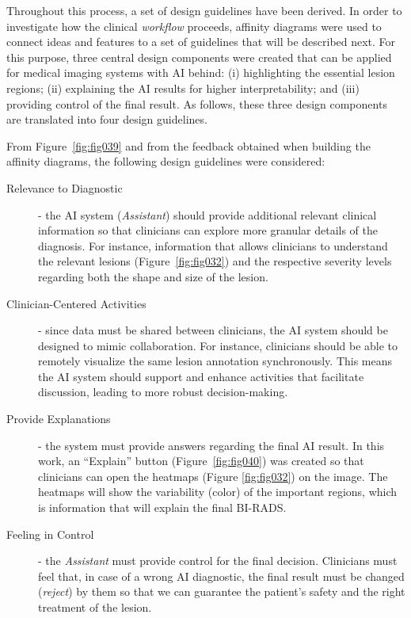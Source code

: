 Throughout this process, a set of design guidelines have been derived.
In order to investigate how the clinical {\it workflow} proceeds, affinity diagrams were used to connect ideas and features to a set of guidelines that will be described next.
For this purpose, three central design components were created that can be applied for medical imaging systems with \ac{AI} behind:
(i) highlighting the essential lesion regions;
(ii) explaining the \ac{AI} results for higher interpretability; and
(iii) providing control of the final result.
As follows, these three design components are translated into four design guidelines.

\noindent
From Figure~\ref{fig:fig039} and from the feedback obtained when building the affinity diagrams, the following design guidelines were considered:

\vspace{1.00mm}

\begin{description}
\item[Relevance to Diagnostic] - the \ac{AI} system ({\it Assistant}) should provide additional relevant clinical information so that clinicians can explore more granular details of the diagnosis.
For instance, information that allows clinicians to understand the relevant lesions (Figure~\ref{fig:fig032}) and the respective severity levels regarding both the shape and size of the lesion.

\vspace{1.50mm}

\item[Clinician-Centered Activities] - since data must be shared between clinicians, the \ac{AI} system should be designed to mimic collaboration.
For instance, clinicians should be able to remotely visualize the same lesion annotation synchronously.
This means the \ac{AI} system should support and enhance activities that facilitate discussion, leading to more robust decision-making.

\vspace{1.50mm}

\item[Provide Explanations] - the system must provide answers regarding the final \ac{AI} result.
In this work, an ``Explain'' button (Figure~\ref{fig:fig040}) was created so that clinicians can open the heatmaps (Figure \ref{fig:fig032}) on the image.
The heatmaps will show the variability (color) of the important regions, which is information that will explain the final \ac{BI-RADS}.

\vspace{1.50mm}

\item[Feeling in Control] - the {\it Assistant} must provide control for the final decision. Clinicians must feel that, in case of a wrong \ac{AI} diagnostic, the final result must be changed ({\it reject}) by them so that we can guarantee the patient's safety and the right treatment of the lesion.
\end{description}

